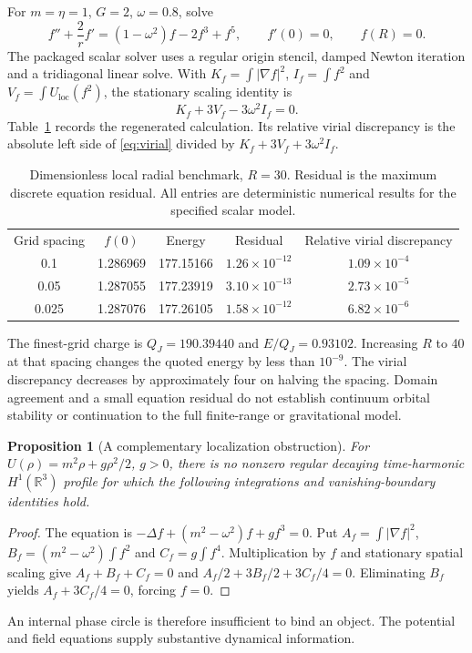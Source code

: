 \documentclass[aip,adv,reprint,onecolumn,amsmath,amssymb]{revtex4-2}
\newcommand{\R}{\mathbb R}
\newtheorem{proposition}[theorem]{Proposition}
\begin{document}
For $m=\eta=1$, $G=2$, $\omega=0.8$, solve
\begin{equation}
 f''+\frac2r f'=(1-\omega^2)f-2f^3+f^5,\qquad f'(0)=0,\qquad f(R)=0.
 \label{eq:radial}
\end{equation}
The packaged scalar solver uses a regular origin stencil, damped Newton iteration and a tridiagonal linear solve. With $K_f=\int|\nabla f|^2$, $I_f=\int f^2$ and $V_f=\int U_{\mathrm{loc}}(f^2)$, the stationary scaling identity is
\begin{equation}
 K_f+3V_f-3\omega^2I_f=0.
 \label{eq:virial}
\end{equation}
Table~\ref{tab:radial} records the regenerated calculation. Its relative virial discrepancy is the absolute left side of \eqref{eq:virial} divided by $K_f+3V_f+3\omega^2I_f$.
\begin{table}[tb]
\caption{Dimensionless local radial benchmark, $R=30$. Residual is the maximum discrete equation residual. All entries are deterministic numerical results for the specified scalar model.}
\label{tab:radial}
\begin{ruledtabular}\begin{tabular}{ccccc}
Grid spacing & $f(0)$ & Energy & Residual & Relative virial discrepancy\\
0.1 & 1.286969 & 177.15166 & $1.26\times10^{-12}$ & $1.09\times10^{-4}$\\
0.05 & 1.287055 & 177.23919 & $3.10\times10^{-13}$ & $2.73\times10^{-5}$\\
0.025 & 1.287076 & 177.26105 & $1.58\times10^{-12}$ & $6.82\times10^{-6}$\\
\end{tabular}\end{ruledtabular}
\end{table}
The finest-grid charge is $Q_J=190.39440$ and $E/Q_J=0.93102$. Increasing $R$ to 40 at that spacing changes the quoted energy by less than $10^{-9}$. The virial discrepancy decreases by approximately four on halving the spacing. Domain agreement and a small equation residual do not establish continuum orbital stability or continuation to the full finite-range or gravitational model.

\begin{proposition}[A complementary localization obstruction]
For $U(\rho)=m^2\rho+g\rho^2/2$, $g>0$, there is no nonzero regular decaying time-harmonic $H^1(\R^3)$ profile for which the following integrations and vanishing-boundary identities hold.
\end{proposition}
\begin{proof}
The equation is $-\Delta f+(m^2-\omega^2)f+gf^3=0$. Put $A_f=\int|\nabla f|^2$, $B_f=(m^2-\omega^2)\int f^2$ and $C_f=g\int f^4$. Multiplication by $f$ and stationary spatial scaling give $A_f+B_f+C_f=0$ and $A_f/2+3B_f/2+3C_f/4=0$. Eliminating $B_f$ yields $A_f+3C_f/4=0$, forcing $f=0$.
\end{proof}
An internal phase circle is therefore insufficient to bind an object. The potential and field equations supply substantive dynamical information.
\end{document}
